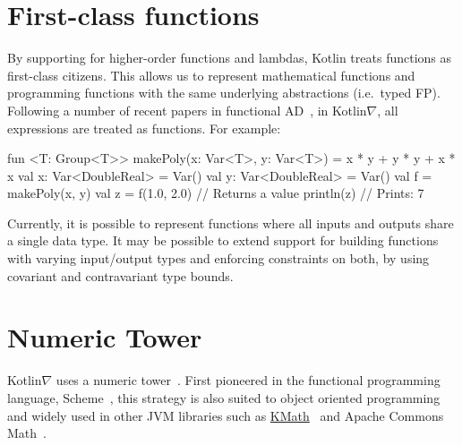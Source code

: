 \documentclass[12pt,initial,twoside,maitrise]{dms}
\numberwithin{equation}{section}
\numberwithin{table}{chapter}
\numberwithin{figure}{chapter}
\begin{document}
\section{First-class functions}\label{sec:first-class-functions}

By supporting for higher-order functions and lambdas, Kotlin treats functions as first-class citizens. This allows us to represent mathematical functions and programming functions with the same underlying abstractions (i.e.\ typed FP). Following a number of recent papers in functional AD~\citep{pearlmutter2008reverse,wang2018backpropagation}, in Kotlin$\nabla$, all expressions are treated as functions. For example:

\begin{kotlinlisting}
fun <T: Group<T>> makePoly(x: Var<T>, y: Var<T>) = x * y + y * y + x * x
val x: Var<DoubleReal> = Var()
val y: Var<DoubleReal> = Var()
val f = makePoly(x, y)
val z = f(1.0, 2.0) // Returns a value
println(z) // Prints: 7
\end{kotlinlisting}
%
Currently, it is possible to represent functions where all inputs and outputs share a single data type. It may be possible to extend support for building functions with varying input/output types and enforcing constraints on both, by using covariant and contravariant type bounds.

\section{Numeric Tower}\label{sec:numeric-tower}

Kotlin$\nabla$ uses a numeric tower~\citep{st2012typing}. First pioneered in the functional programming language, Scheme~\citep{sperber2009revised}, this strategy is also suited to object oriented programming~\citep{niculescu2003design, niculescu2011using} and widely used in other JVM libraries such as \href{https://github.com/mipt-npm/kmath}{KMath}~\citep{nozik2019acat} and Apache Commons Math~\citep{developers2012apache}.
\end{document}
